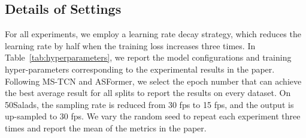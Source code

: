 \documentclass[letterpaper]{article} \usepackage[submission]{aaai23}  \usepackage{times}  \usepackage{helvet}  \usepackage{courier}  \usepackage[hyphens]{url}  \usepackage{graphicx} \urlstyle{rm} \def\UrlFont{\rm}  \usepackage{natbib}  \usepackage{caption} \frenchspacing  \setlength{\pdfpagewidth}{8.5in} \setlength{\pdfpageheight}{11in} \usepackage{algorithm}
\begin{document}
\subsection{Details of Settings}
For all experiments, we employ a learning rate decay strategy, which reduces the learning rate by half when the training loss increases three times. In Table~\ref{tab:hyperparameters}, we report the model configurations and training hyper-parameters corresponding to the experimental results in the paper. Following MS-TCN and ASFormer, we select the epoch number that can achieve the best average result for all splits to report the results on every dataset. On 50Salads, the sampling rate is reduced from 30 fps to 15 fps, and the output is up-sampled to 30 fps. We vary the random seed to repeat each experiment three times and report the mean of the metrics in the paper.
\end{document}
